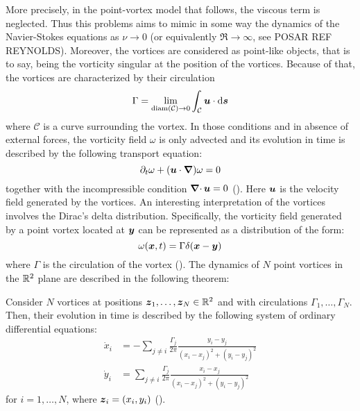 \documentclass[../main.tex]{subfiles}
\begin{document}
More precisely, in the point-vortex model that follows, the viscous term is neglected. Thus this problems aims to mimic in some way the dynamics of the Navier-Stokes equations as $\nu \to 0$ (or equivalently $\Re\to\infty$, see POSAR REF REYNOLDS). Moreover, the vortices are considered as point-like objects, that is to say, being the vorticity singular at the position of the vortices. Because of that, the vortices are characterized by their circulation
\begin{equation}
	\Gamma = \lim_{\operatorname{diam}(\mathcal{C})\to 0} \int_{\mathcal{C}} \boldsymbol{u} \cdot \dd{\boldsymbol{s}}
\end{equation}
where $\mathcal{C}$ is a curve surrounding the vortex. In those conditions and in absence of external forces, the vorticity field $\omega$ is only advected and its evolution in time is described by the following transport equation:
\begin{equation}
	\partial_t \omega + (\boldsymbol{u} \cdot \grad) \omega = 0
\end{equation}
together with the incompressible condition $\operatorname{\boldsymbol{\nabla}\cdot} \boldsymbol{u}=0$ (\cite{pointvortexmath}). Here $\boldsymbol{u}$ is the velocity field generated by the vortices. An interesting interpretation of the vortices involves the Dirac's delta distribution. Specifically, the vorticity field generated by a point vortex located at $\boldsymbol{y}$ can be represented as a distribution of the form:
\begin{equation}\label{eq:vorticity_delta}
	\omega(\boldsymbol{x}, t) = \Gamma \delta(\boldsymbol{x}-\boldsymbol{y})
\end{equation}
where $\Gamma$ is the circulation of the vortex (\cite{Saffman}). The dynamics of $N$ point vortices in the $\mathbb{R}^2$ plane are described in the following theorem:
\\
\begin{theorem}
	Consider $N$ vortices at positions $\boldsymbol{z}_1,\ldots,\boldsymbol{z}_N\in \mathbb{R}^2$ and with circulations $\Gamma_1,\ldots,\Gamma_N$. Then, their evolution in time is described by the following system of ordinary differential equations:
	\begin{align}
		\dot{x}_i & = -\sum_{j\neq i} \frac{\Gamma_j}{2\pi} \frac{y_i-y_j}{{(x_i-x_j)}^2+{(y_i-y_j)}^2} \\
		\dot{y}_i & = \sum_{j\neq i} \frac{\Gamma_j}{2\pi} \frac{x_i-x_j}{{(x_i-x_j)}^2+{(y_i-y_j)}^2}
	\end{align}
	for $i=1,\ldots,N$, where $\boldsymbol{z}_i=(x_i,y_i)$ (\cite{pointvortex}).
\end{theorem}
\end{document}
